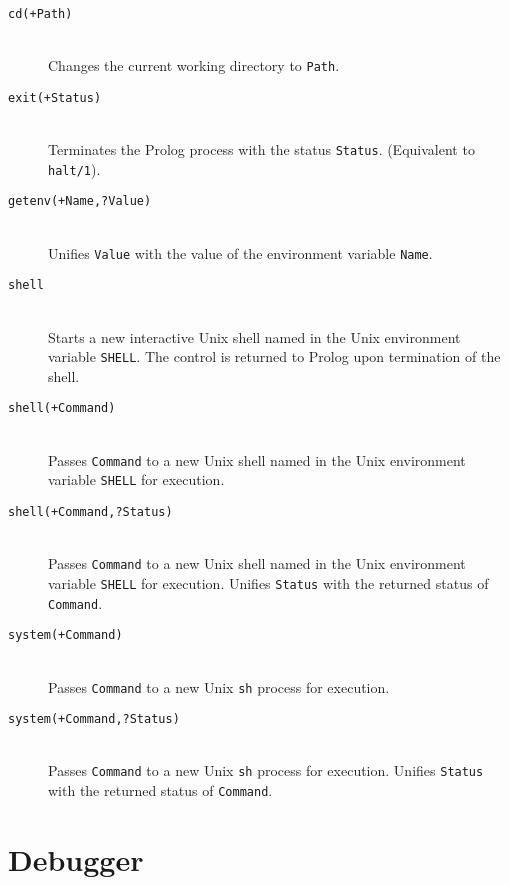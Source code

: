 \begin{description}
\begin{description}
	\item [{\tt cd(+Path)}]~\\
		Changes the current working directory to {\tt Path}.

	\item [{\tt exit(+Status)}]~\\
		Terminates the Prolog process with the status {\tt Status}.
		(Equivalent to {\tt halt/1}).

	\item [{\tt getenv(+Name,?Value)}]~\\
		Unifies {\tt Value} with the value of the environment
		variable {\tt Name}.

	\item [{\tt shell}]~\\
		Starts a new interactive Unix shell named in the Unix
		environment variable {\tt SHELL}.  The control is
		returned to Prolog upon termination of the shell.  

	\item [{\tt shell(+Command)}]~\\
		Passes {\tt Command} to a new Unix shell named in the
		Unix environment variable {\tt SHELL} for execution.  

	\item [{\tt shell(+Command,?Status)}]~\\
		Passes {\tt Command} to a new Unix shell named in the
		Unix environment variable {\tt SHELL} for execution.
		Unifies {\tt Status} with the returned status of 
		{\tt Command}.   

	\item [{\tt system(+Command)}]~\\
		Passes {\tt Command} to a new Unix {\tt sh} process for
		execution. 

	\item [{\tt system(+Command,?Status)}]~\\
		Passes {\tt Command} to a new Unix {\tt sh} process for
		execution.  Unifies {\tt Status} with the returned
		status of {\tt Command}. 

	\end{description}


\end{description}



\section{Debugger}
\label{debug}

